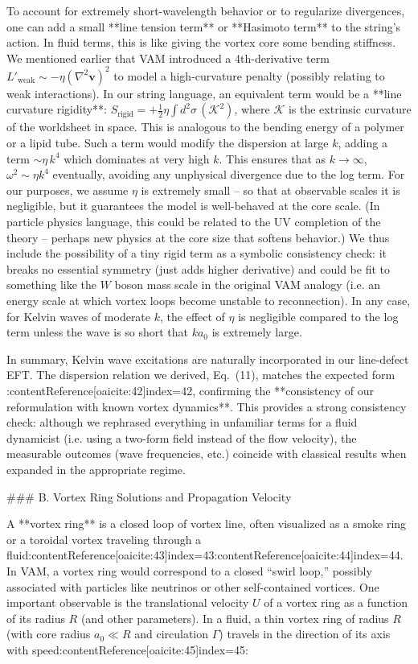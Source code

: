 \documentclass[12pt]{article}
\begin{document}
To account for extremely short-wavelength behavior or to regularize divergences, one can add a small **line tension term** or **Hasimoto term** to the string’s action. In fluid terms, this is like giving the vortex core some bending stiffness. We mentioned earlier that VAM introduced a 4th-derivative term $L'_{\text{weak}} \sim -\eta (\nabla^2 \mathbf{v})^2$ to model a high-curvature penalty (possibly relating to weak interactions). In our string language, an equivalent term would be a **line curvature rigidity**: $S_{\text{rigid}} = + \frac{1}{2}\eta \int d^2\sigma\, (\mathcal{K}^2)$, where $\mathcal{K}$ is the extrinsic curvature of the worldsheet in space. This is analogous to the bending energy of a polymer or a lipid tube. Such a term would modify the dispersion at large $k$, adding a term $\sim \eta\, k^4$ which dominates at very high $k$. This ensures that as $k \to \infty$, $\omega^2 \sim \eta k^4$ eventually, avoiding any unphysical divergence due to the log term. For our purposes, we assume $\eta$ is extremely small – so that at observable scales it is negligible, but it guarantees the model is well-behaved at the core scale. (In particle physics language, this could be related to the UV completion of the theory – perhaps new physics at the core size that softens behavior.) We thus include the possibility of a tiny rigid term as a symbolic consistency check: it breaks no essential symmetry (just adds higher derivative) and could be fit to something like the $W$ boson mass scale in the original VAM analogy (i.e. an energy scale at which vortex loops become unstable to reconnection). In any case, for Kelvin waves of moderate $k$, the effect of $\eta$ is negligible compared to the log term unless the wave is so short that $k a_0$ is extremely large. 

In summary, Kelvin wave excitations are naturally incorporated in our line-defect EFT. The dispersion relation we derived, Eq. (11), matches the expected form :contentReference[oaicite:42]{index=42}, confirming the **consistency of our reformulation with known vortex dynamics**. This provides a strong consistency check: although we rephrased everything in unfamiliar terms for a fluid dynamicist (i.e. using a two-form field instead of the flow velocity), the measurable outcomes (wave frequencies, etc.) coincide with classical results when expanded in the appropriate regime. 

### B. Vortex Ring Solutions and Propagation Velocity

A **vortex ring** is a closed loop of vortex line, often visualized as a smoke ring or a toroidal vortex traveling through a fluid:contentReference[oaicite:43]{index=43}:contentReference[oaicite:44]{index=44}. In VAM, a vortex ring would correspond to a closed “swirl loop,” possibly associated with particles like neutrinos or other self-contained vortices. One important observable is the translational velocity $U$ of a vortex ring as a function of its radius $R$ (and other parameters). In a fluid, a thin vortex ring of radius $R$ (with core radius $a_0 \ll R$ and circulation $\Gamma$) travels in the direction of its axis with speed:contentReference[oaicite:45]{index=45}:
\end{document}
